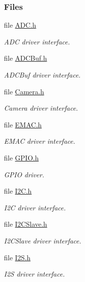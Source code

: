 \subsubsection*{Files}
\begin{DoxyCompactItemize}
\item 
file \hyperlink{_a_d_c_8h}{A\+D\+C.\+h}
\begin{DoxyCompactList}\small\item\em A\+D\+C driver interface. \end{DoxyCompactList}\item 
file \hyperlink{_a_d_c_buf_8h}{A\+D\+C\+Buf.\+h}
\begin{DoxyCompactList}\small\item\em A\+D\+C\+Buf driver interface. \end{DoxyCompactList}\item 
file \hyperlink{_camera_8h}{Camera.\+h}
\begin{DoxyCompactList}\small\item\em Camera driver interface. \end{DoxyCompactList}\item 
file \hyperlink{_e_m_a_c_8h}{E\+M\+A\+C.\+h}
\begin{DoxyCompactList}\small\item\em E\+M\+A\+C driver interface. \end{DoxyCompactList}\item 
file \hyperlink{_g_p_i_o_8h}{G\+P\+I\+O.\+h}
\begin{DoxyCompactList}\small\item\em G\+P\+I\+O driver. \end{DoxyCompactList}\item 
file \hyperlink{_i2_c_8h}{I2\+C.\+h}
\begin{DoxyCompactList}\small\item\em I2\+C driver interface. \end{DoxyCompactList}\item 
file \hyperlink{_i2_c_slave_8h}{I2\+C\+Slave.\+h}
\begin{DoxyCompactList}\small\item\em I2\+C\+Slave driver interface. \end{DoxyCompactList}\item 
file \hyperlink{_i2_s_8h}{I2\+S.\+h}
\begin{DoxyCompactList}\small\item\em I2\+S driver interface. \end{DoxyCompactList}\item 

\end{DoxyCompactItemize}
